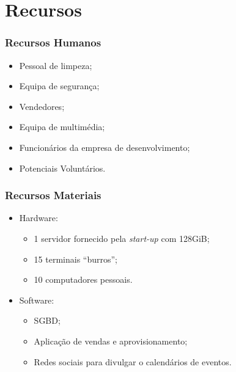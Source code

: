 \documentclass[a4paper,12pt]{scrreprt}
\begin{document}
        \section{Recursos}
             \subsubsection{Recursos Humanos}
             \begin{itemize}
               \item Pessoal de limpeza;
               \item Equipa de seguran\c{c}a;
               \item Vendedores;
               \item Equipa de multim\'edia;
               \item Funcion\'{a}rios da empresa de desenvolvimento;
               \item Potenciais Volunt\'arios.
             \end{itemize}
             \subsubsection{Recursos Materiais}
             \begin{itemize}
             \item{Hardware:}
               \begin{itemize}
                 \item 1 servidor fornecido pela \textit{start-up} com 128GiB;
                 \item 15 terminais ``burros'';
                 \item 10 computadores pessoais.
               \end{itemize}
             \item{Software:}
               \begin{itemize}
                 \item SGBD;
                 \item Aplicação de vendas e aprovisionamento;
                 \item Redes sociais para divulgar o calendários de eventos.
               \end{itemize}
             \end{itemize}
\end{document}
